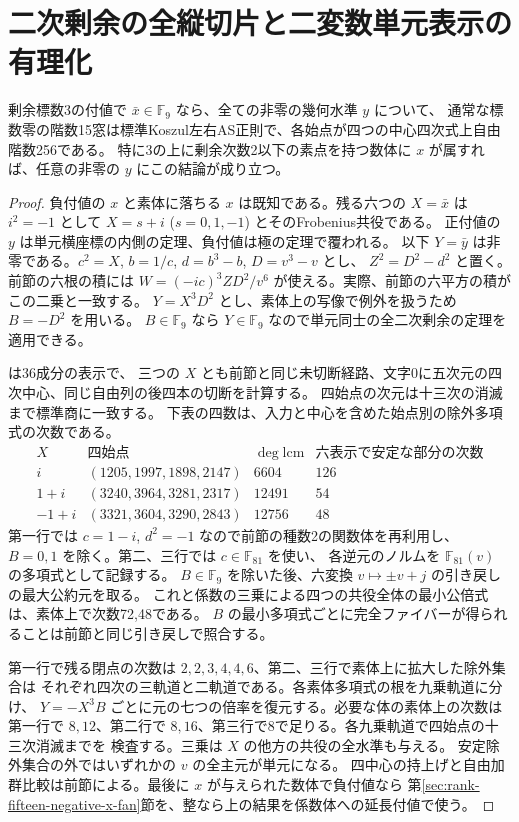 \section{二次剰余の全縦切片と二変数単元表示の有理化}
\label{sec:rank-fifteen-quadratic-verticals}
\begin{theorem}\label{thm:rank-fifteen-all-quadratic-verticals}
剰余標数3の付値で $\bar x\in\mathbb F_9$ なら、全ての非零の幾何水準 $y$ について、
通常な標数零の階数15窓は標準Koszul左右AS正則で、各始点が四つの中心四次式上自由階数256である。
特に3の上に剰余次数2以下の素点を持つ数体に $x$ が属すれば、任意の非零の $y$ にこの結論が成り立つ。
\end{theorem}
\begin{proof}
負付値の $x$ と素体に落ちる $x$ は既知である。残る六つの $X=\bar x$ は
$i^2=-1$ として $X=s+i$ ($s=0,1,-1$) とそのFrobenius共役である。
正付値の $y$ は単元横座標の内側の定理、負付値は極の定理で覆われる。
以下 $Y=\bar y$ は非零である。$c^2=X$, $b=1/c$, $d=b^3-b$, $D=v^3-v$ とし、
$Z^2=D^2-d^2$ と置く。前節の六根の積には
$W=(-ic)^3ZD^2/v^6$ が使える。実際、前節の六平方の積がこの二乗と一致する。
$Y=X^3D^2$ とし、素体上の写像で例外を扱うため $B=-D^2$ を用いる。
$B\in\mathbb F_9$ なら $Y\in\mathbb F_9$ なので単元同士の全二次剰余の定理を適用できる。

 は36成分の表示で、
三つの $X$ とも前節と同じ未切断経路、文字0に五次元の四次中心、同じ自由列の後四本の切断を計算する。
四始点の次元は十三次の消滅まで標準商に一致する。
下表の四数は、入力と中心を含めた始点別の除外多項式の次数である。
\[
\begin{array}{c|c|r|r}
 X & \text{四始点} & \deg\mathrm{lcm} & \text{六表示で安定な部分の次数}\\ \hline
 i &(1205,1997,1898,2147)&6604&126\\
 1+i &(3240,3964,3281,2317)&12491&54\\
 -1+i &(3321,3604,3290,2843)&12756&48
\end{array}
\]
第一行では $c=1-i$, $d^2=-1$ なので前節の種数2の関数体を再利用し、
$B=0,1$ を除く。第二、三行では $c\in\mathbb F_{81}$ を使い、
各逆元のノルムを $\mathbb F_{81}(v)$ の多項式として記録する。
$B\in\mathbb F_9$ を除いた後、六変換 $v\mapsto\pm v+j$ の引き戻しの最大公約元を取る。
これと係数の三乗による四つの共役全体の最小公倍式は、素体上で次数72,48である。
$B$ の最小多項式ごとに完全ファイバーが得られることは前節と同じ引き戻しで照合する。

第一行で残る閉点の次数は $2,2,3,4,4,6$、第二、三行で素体上に拡大した除外集合は
それぞれ四次の三軌道と二軌道である。各素体多項式の根を九乗軌道に分け、
$Y=-X^3B$ ごとに元の七つの倍率を復元する。必要な体の素体上の次数は
第一行で $8,12$、第二行で $8,16$、第三行で8で足りる。各九乗軌道で四始点の十三次消滅までを
検査する。三乗は $X$ の他方の共役の全水準も与える。
安定除外集合の外ではいずれかの $v$ の全主元が単元になる。
四中心の持上げと自由加群比較は前節による。最後に $x$ が与えられた数体で負付値なら
第\ref{sec:rank-fifteen-negative-x-fan}節を、整なら上の結果を係数体への延長付値で使う。
\end{proof}

